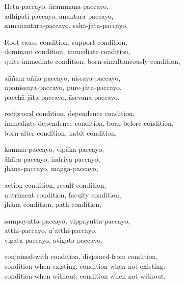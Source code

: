 

Hetu-paccayo, ārammaṇa-paccayo,\\
adhipati-paccayo, anantara-paccayo,\\
samanantara-paccayo, saha-jāta-paccayo,

\clearpage

\begin{english}
  Root-cause condition, support condition,\\
  dominant condition, immediate condition,\\
  quite-immediate condition, born-simultaneously condition,
\end{english}

aññam-añña-paccayo, nissaya-paccayo,\\
upanissaya-paccayo, pure-jāta-paccayo,\\
pacchā-jāta-paccayo, āsevana-paccayo,

\begin{english}
  reciprocal condition, dependence condition,\\
  immediate-dependence condition, born-before condition,\\
  born-after condition, habit condition,
\end{english}

kamma-paccayo, vipāka-paccayo,\\
āhāra-paccayo, indriya-paccayo,\\
jhāna-paccayo, magga-paccayo,

\begin{english}
  action condition, result condition,\\
  nutriment condition, faculty condition,\\
  jhāna condition, path condition,
\end{english}

sampayutta-paccayo, vippayutta-paccayo,\\
atthi-paccayo, n'atthi-paccayo,\\
vigata-paccayo, avigata-paccayo.

\begin{english}
  conjoined-with condition, disjoined-from condition,\\
  condition when existing, condition when not existing,\\
  condition when without, condition when not without.
\end{english}

